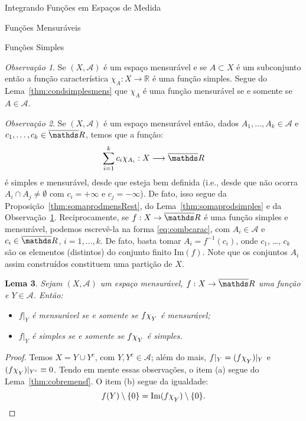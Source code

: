 \documentclass[oneside,final,11pt]{amsbook}
\newcommand{\R}{\mathds R}
\newcommand{\compl}{\mathrm c}
\newcommand{\Img}{\mathrm{Im}}
\newcommand{\chilow}[1]{\chi_{\lower2pt\hbox{$\scriptstyle#1$}}}
\theoremstyle{remark}\newtheorem{exercise}{Exercício}[chapter]
\theoremstyle{remark}\newtheorem{*exercise}[exercise]{\hbox to 0pt{\hskip 0pt minus 1fil*}Exercício}
\theoremstyle{definition}\newtheorem{exdefin}{Definição}[chapter]
\theoremstyle{plain}\newtheorem{teo}{Teorema}[section]
\theoremstyle{plain}\newtheorem{lem}[teo]{Lema}
\theoremstyle{plain}\newtheorem{prop}[teo]{Proposição}
\theoremstyle{plain}\newtheorem{cor}[teo]{Corolário}
\theoremstyle{definition}\newtheorem{defin}[teo]{Definição}
\theoremstyle{remark}\newtheorem{rem}[teo]{Observação}
\theoremstyle{definition}\newtheorem{notation}[teo]{Notação}
\theoremstyle{definition}\newtheorem{convention}[teo]{Convenção}
\theoremstyle{definition}\newtheorem{example}[teo]{Exemplo}
\numberwithin{section}{chapter}
\numberwithin{equation}{section}
\begin{document}
\begin{chapter}{Integrando Funções em Espaços de Medida}
\begin{section}{Funções Mensuráveis}
\begin{subsection}{Funções Simples}
\begin{rem}\label{thm:remchiAmens}
Se $(X,\mathcal A)$ é um espaço mensurável e se $A\subset X$ é um subconjunto então a função característica $\chi_A:X\to\R$
é uma função simples. Segue do Lema~\ref{thm:condsimplesmens} que $\chi_A$ é uma função mensurável
se e somente se $A\in\mathcal A$.
\end{rem}

\begin{rem}\label{thm:funcsimples}
Se $(X,\mathcal A)$ é um espaço mensurável então, dados $A_1,\ldots,A_k\in\mathcal A$ e $c_1,\ldots,c_k\in\overline\R$,
temos que a função:
\begin{equation}\label{eq:combcarac}
\sum_{i=1}^kc_i\chi_{A_i}:X\longrightarrow\overline\R
\end{equation}
é simples e mensurável, desde que esteja bem definida (i.e., desde que não ocorra $A_i\cap A_j\ne\emptyset$
com $c_i=+\infty$ e $c_j=-\infty$). De fato, isso segue da Proposição~\ref{thm:somaprodmensRest},
do Lema~\ref{thm:somaprodsimples} e da Observação~\ref{thm:remchiAmens}. Reciprocamente, se $f:X\to\overline\R$
é uma função simples e mensurável, podemos escrevê-la na forma \eqref{eq:combcarac}, com $A_i\in\mathcal A$
e $c_i\in\overline\R$, $i=1,\ldots,k$. De fato, basta tomar $A_i=f^{-1}(c_i)$, onde $c_1$, \dots, $c_k$ são os
elementos (distintos) do conjunto finito $\Img(f)$. Note que os conjuntos $A_i$ assim construídos
constituem uma partição de $X$.
\end{rem}

\begin{lem}\label{thm:fYfchiY}
Sejam $(X,\mathcal A)$ um espaço mensurável, $f:X\to\overline\R$ uma função e $Y\in\mathcal A$.
Então:
\begin{itemize}
\item[(a)] $f\vert_Y$ é mensurável se e somente se $f\chilow Y$ é mensurável;
\item[(b)] $f\vert_Y$ é simples se e somente se $f\chilow Y$ é simples.
\end{itemize}
\end{lem}
\begin{proof}
Temos $X=Y\cup Y^\compl$, com $Y,Y^\compl\in\mathcal A$; além do mais, $f\vert_Y=(f\chilow Y)\vert_Y$
e $(f\chilow Y)\vert_{Y^\compl}\equiv0$. Tendo em mente essas observações, o item (a) segue do Lema~\ref{thm:cobremensf}.
O item (b) segue da igualdade:
\[f(Y)\setminus\{0\}=\Img(f\chilow Y)\setminus\{0\}.\qedhere\]
\end{proof}


\end{subsection}
\end{section}
\end{chapter}
\end{document}
